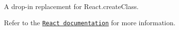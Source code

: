 A drop-\/in replacement for {\ttfamily React.\+create\+Class}.

Refer to the \href{https://facebook.github.io/react/docs/react-without-es6.html}{\tt React documentation} for more information. 